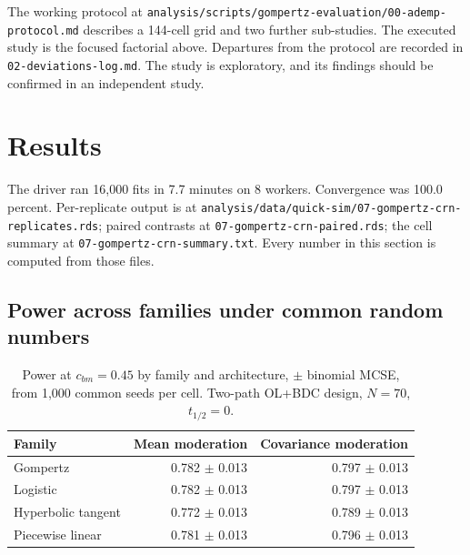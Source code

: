 \documentclass[
  11pt,
]{article}
\begin{document}
The working protocol at
\texttt{analysis/scripts/gompertz-evaluation/00-ademp-protocol.md} describes a
144-cell grid and two further sub-studies. The executed study is the
focused factorial above. Departures from the protocol are recorded in
\texttt{02-deviations-log.md}. The study is exploratory, and its findings
should be confirmed in an independent study.

\section{Results}\label{results}

The driver ran 16,000 fits in 7.7 minutes on 8 workers. Convergence was 100.0 percent. Per-replicate output is at \texttt{analysis/data/quick-sim/07-gompertz-crn-replicates.rds}; paired contrasts at \texttt{07-gompertz-crn-paired.rds}; the cell summary at \texttt{07-gompertz-crn-summary.txt}. Every number in this section is computed from those files.

\subsection{Power across families under common random numbers}\label{power-across-families-under-common-random-numbers}

\begin{table}

\caption{\label{tab:tab-power}Power at $c_{bm} = 0.45$ by family and architecture, $\pm$ binomial MCSE, from 1,000 common seeds per cell. Two-path OL+BDC design, $N = 70$, $t_{1/2} = 0$.}
\centering
\begin{tabular}[t]{lrr}
\toprule
Family & Mean moderation & Covariance moderation\\
\midrule
Gompertz & 0.782 $\pm$ 0.013 & 0.797 $\pm$ 0.013\\
Logistic & 0.782 $\pm$ 0.013 & 0.797 $\pm$ 0.013\\
Hyperbolic tangent & 0.772 $\pm$ 0.013 & 0.789 $\pm$ 0.013\\
Piecewise linear & 0.781 $\pm$ 0.013 & 0.796 $\pm$ 0.013\\
\bottomrule
\end{tabular}
\end{table}
\end{document}
